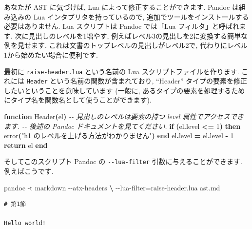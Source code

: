 \documentclass[
  11pt,
]{bxjsreport}
\newenvironment{Shaded}{\begin{snugshade}}{\end{snugshade}}
\newcommand{\CommentTok}[1]{\textcolor[rgb]{0.56,0.35,0.01}{\textit{#1}}}
\newcommand{\ControlFlowTok}[1]{\textcolor[rgb]{0.13,0.29,0.53}{\textbf{#1}}}
\newcommand{\DecValTok}[1]{\textcolor[rgb]{0.00,0.00,0.81}{#1}}
\newcommand{\ExtensionTok}[1]{#1}
\newcommand{\FunctionTok}[1]{\textcolor[rgb]{0.00,0.00,0.00}{#1}}
\newcommand{\KeywordTok}[1]{\textcolor[rgb]{0.13,0.29,0.53}{\textbf{#1}}}
\newcommand{\NormalTok}[1]{#1}
\newcommand{\OperatorTok}[1]{\textcolor[rgb]{0.81,0.36,0.00}{\textbf{#1}}}
\newcommand{\StringTok}[1]{\textcolor[rgb]{0.31,0.60,0.02}{#1}}
\begin{document}
あなたが AST に気づけば, Lua によって修正することができます. Pandoc は組み込みの Lua インタプリタを持っているので, 追加でツールをインストールする必要はありません. Lua スクリプトは Pandoc では「Lua フィルタ」と呼ばれます. 次に見出しのレベルを1増やす, 例えばレベル3の見出しを2に変換する簡単な例を見せます. これは文書のトップレベルの見出しがレベル2で, 代わりにレベル1から始めたい場合に便利です.

最初に \texttt{raise-header.lua} という名前の Lua スクリプトファイルを作ります. これには \texttt{Header} という名前の関数が含まれており, ``Header'' タイプの要素を修正したいということを意味しています (一般に, あるタイプの要素を処理するためにタイプ名を関数名として使うことができます).

\begin{Shaded}
\begin{Highlighting}[numbers=left,,]
\KeywordTok{function}\NormalTok{ Header}\OperatorTok{(}\NormalTok{el}\OperatorTok{)}
  \CommentTok{{-}{-} 見出しのレベルは要素の持つ \textquotesingle{}level\textquotesingle{} 属性でアクセスできます.}
  \CommentTok{{-}{-} 後述の Pandoc ドキュメントを見てください.}
  \ControlFlowTok{if} \OperatorTok{(}\NormalTok{el}\OperatorTok{.}\NormalTok{level }\OperatorTok{\textless{}=} \DecValTok{1}\OperatorTok{)} \ControlFlowTok{then}
    \FunctionTok{error}\OperatorTok{(}\StringTok{"h1 のレベルを上げる方法がわかりません"}\OperatorTok{)}
  \ControlFlowTok{end}
\NormalTok{  el}\OperatorTok{.}\NormalTok{level }\OperatorTok{=}\NormalTok{ el}\OperatorTok{.}\NormalTok{level }\OperatorTok{{-}} \DecValTok{1}
  \ControlFlowTok{return}\NormalTok{ el}
\KeywordTok{end}
\end{Highlighting}
\end{Shaded}

そしてこのスクリプト Pandoc の \texttt{-\/-lua-filter} 引数に与えることができます. 例えばこうです.

\begin{Shaded}
\begin{Highlighting}[numbers=left,,]
\ExtensionTok{pandoc}\NormalTok{ {-}t markdown {-}{-}atx{-}headers }\KeywordTok{\textbackslash{}}
  \ExtensionTok{{-}{-}lua{-}filter}\NormalTok{=raise{-}header.lua ast.md}
\end{Highlighting}
\end{Shaded}

\begin{verbatim}
# 第1節

Hello world!
\end{verbatim}
\end{document}
